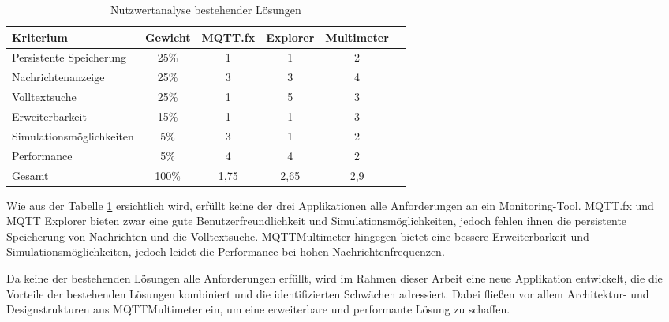 \begin{table}[htbp] 
    \centering 
    \caption{Nutzwertanalyse bestehender Lösungen} 
    \label{tab:nutzwertanalyse}
    \begin{tabular}{lccccc} 
        \toprule Kriterium & Gewicht & MQTT.fx & Explorer & Multimeter \\ 
        \midrule 
        Persistente Speicherung & 25\% & 1 & 1 & 2 \\ 
        Nachrichtenanzeige & 25\% & 3 & 3 & 4 \\
        Volltextsuche & 25\% & 1 & 5 & 3 \\ 
        Erweiterbarkeit & 15\% & 1 & 1 & 3 \\ 
        Simulationsmöglichkeiten & 5\% & 3 & 1 & 2 \\ 
        Performance & 5\% & 4 & 4 & 2 \\ 
        \midrule Gesamt & 100\% & 1,75 & 2,65 & 2,9 \\ 
        \bottomrule 
    \end{tabular} 
\end{table}

Wie aus der Tabelle \ref{tab:nutzwertanalyse} ersichtlich wird, erfüllt keine der drei Applikationen alle Anforderungen an ein Monitoring-Tool. MQTT.fx und MQTT Explorer bieten zwar eine gute Benutzerfreundlichkeit und Simulationsmöglichkeiten, jedoch fehlen ihnen die persistente Speicherung von Nachrichten und die Volltextsuche. MQTTMultimeter hingegen bietet eine bessere Erweiterbarkeit und Simulationsmöglichkeiten, jedoch leidet die Performance bei hohen Nachrichtenfrequenzen.

Da keine der bestehenden Lösungen alle Anforderungen erfüllt, wird im Rahmen dieser Arbeit eine neue Applikation entwickelt, die die Vorteile der bestehenden Lösungen kombiniert und die identifizierten Schwächen adressiert. Dabei fließen vor allem Architektur- und Designstrukturen aus MQTTMultimeter ein, um eine erweiterbare und performante Lösung zu schaffen.


    

